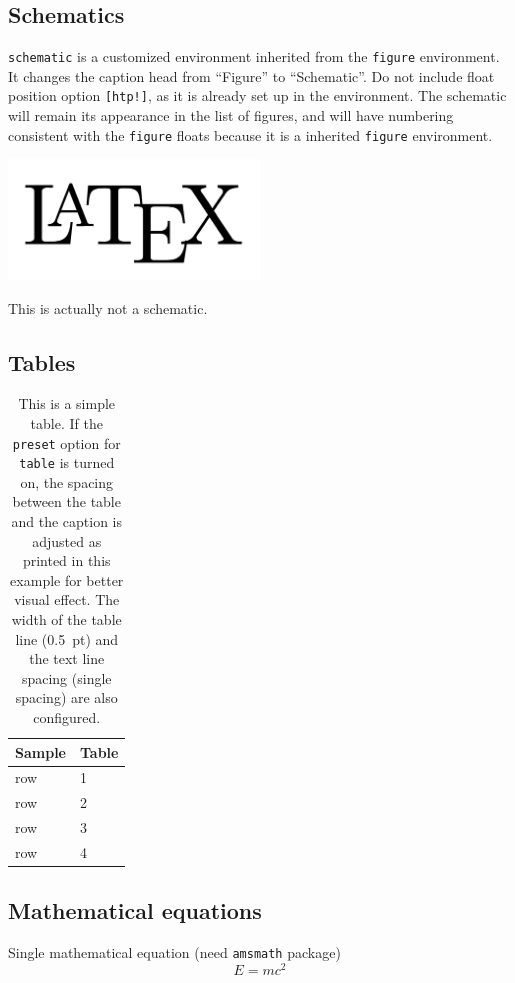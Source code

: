 \documentclass[final]{emory}
\begin{document}
\subsection{Schematics}

\Verb|schematic| is a customized environment inherited from the \Verb|figure|
environment. It changes the caption head from ``Figure'' to ``Schematic''. Do 
not include float position option
\Verb|[htp!]|, as it is already set up in the environment. The schematic will 
remain its appearance in the list of figures, and will have numbering 
consistent with the \Verb|figure| floats because it is a inherited 
\Verb|figure| environment.

\begin{schematic}
	\centering
  \includegraphics[width=0.5\textwidth]{LaTeXLogo.png}
  \caption{This is actually not a schematic.\label{schematic}}
\end{schematic}


\subsection{Tables}

\begin{table}[htp!]
  \centering
  \caption[This is a simple table]{This is a simple table. \label{table} If the 
  \protect\Verb|preset| 
  option 
  	for \protect\Verb|table| is turned on, the spacing between the table and 
  	the 
  	caption is adjusted as printed in this example for better visual effect. 
  	The width of the table line (0.5~pt) and the text line spacing (single 
  	spacing) are also configured.}
  \begin{tabular}{l p{}}
    \hline
    Sample & Table \\
    \hline 
    row & 1 \\
    row & 2 \\
    row & 3 \\
    row & 4 \\
    \hline
  \end{tabular}
\end{table}

\subsection{Mathematical equations}
Single mathematical equation (need \Verb|amsmath| package)
\begin{equation}
  E = mc^2 \label{math:single}
\end{equation}
\end{document}
